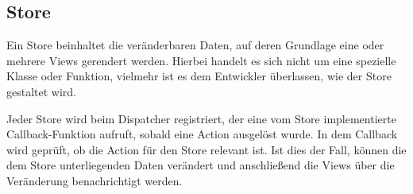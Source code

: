 \subsection{Store}
\label{ssec:gf_store}

Ein Store beinhaltet die veränderbaren Daten, auf deren Grundlage eine oder
mehrere Views gerendert werden.  Hierbei handelt es sich nicht um eine spezielle
Klasse oder Funktion, vielmehr ist es dem Entwickler überlassen, wie der Store
gestaltet wird.

Jeder Store wird beim Dispatcher registriert, der eine vom Store implementierte
Callback-Funktion aufruft, sobald eine Action ausgelöst wurde.  In dem Callback
wird geprüft, ob die Action für den Store relevant ist.  Ist dies der Fall,
können die dem Store unterliegenden Daten verändert und anschließend die Views
über die Veränderung benachrichtigt werden.
